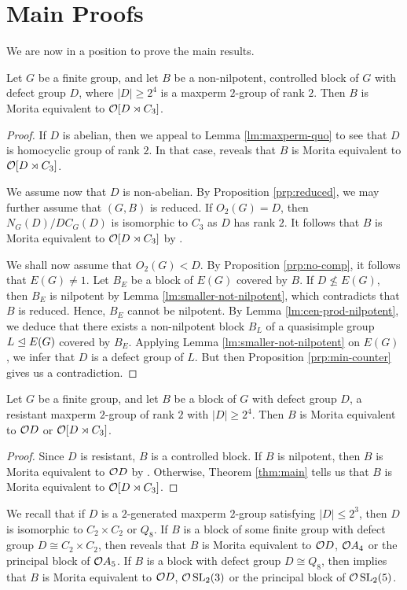 \documentclass[bysection, amsart]{standard}
\begin{document}
\section{Main Proofs} \label{sec:final}
We are now in a position to prove the main results.

\begin{theorem} \label{thm:main}
    Let $G$ be a finite group, and let $B$ be a non-nilpotent, controlled block of $G$ with defect group $D$, where $|D| \geq 2^4$ is a maxperm $2$-group of rank $2$. Then $B$ is Morita equivalent to $\mathcal{O} [D \rtimes C_3]$.
\end{theorem}
\begin{proof}
    If $D$ is abelian, then we appeal to Lemma \ref{lm:maxperm-quo} to see that $D$ is homocyclic group of rank $2$. In that case, \cite{paper:hom-rank-2} reveals that $B$ is Morita equivalent to $\mathcal{O}[D \rtimes C_3]$. 
    
    We assume now that $D$ is non-abelian. By Proposition \ref{prp:reduced}, we may further assume that $(G, B)$ is reduced. If $O_2(G) = D$, then $N_G(D)/DC_G(D)$ is isomorphic to $C_3$ as $D$ has rank $2$. It follows that $B$ is Morita equivalent to $\mathcal{O}[D \rtimes C_3]$ by \cite{paper:kul-normals}. 
    
    We shall now assume that $O_2(G) < D$. By Proposition \ref{prp:no-comp}, it follows that $E(G) \neq 1$. Let $B_E$ be a block of $E(G)$ covered by $B$. If $D \nleq E(G)$, then $B_E$ is nilpotent by Lemma \ref{lm:smaller-not-nilpotent}, which contradicts that $B$ is reduced. Hence, $B_E$ cannot be nilpotent. By Lemma \ref{lm:cen-prod-nilpotent}, we deduce that there exists a non-nilpotent block $B_L$ of a quasisimple group $L \trianglelefteq E(G)$ covered by $B_E$. Applying Lemma \ref{lm:smaller-not-nilpotent} on $E(G)$, we infer that $D$ is a defect group of $L$. But then Proposition \ref{prp:min-counter} gives us a contradiction.
\end{proof}

\begin{corollary}
    Let $G$ be a finite group, and let $B$ be a block of $G$ with defect group $D$, a resistant maxperm $2$-group of rank $2$ with $|D| \geq 2^4$. Then $B$ is Morita equivalent to $\mathcal{O} D$ or $\mathcal{O}[D \rtimes C_3]$.
\end{corollary}
\begin{proof}
    Since $D$ is resistant, $B$ is a controlled block. If $B$ is nilpotent, then $B$ is Morita equivalent to $\mathcal{O} D$ by \cite{paper:nilpotent}. Otherwise, Theorem \ref{thm:main} tells us that $B$ is Morita equivalent to $\mathcal{O}[D \rtimes C_3]$.
\end{proof}
We recall that if $D$ is a $2$-generated maxperm $2$-group satisfying $|D| \leq 2^3$, then $D$ is isomorphic to $C_2 \times C_2$ or $Q_8$. If $B$ is a block of some finite group with defect group $D \cong C_2 \times C_2$, then \cite{paper:li-c2c2} reveals that $B$ is Morita equivalent to $\mathcal{O} D$, $\mathcal{O} A_4$ or the principal block of $\mathcal{O} A_5$. If $B$ is a block with defect group $D \cong Q_8$, then \cite{paper:ei-q8} implies that $B$ is Morita equivalent to $\mathcal{O} D$, $\mathcal{O} \operatorname{SL}_2(3)$ or the principal block of $\mathcal{O} \operatorname{SL}_2(5)$.
\end{document}
